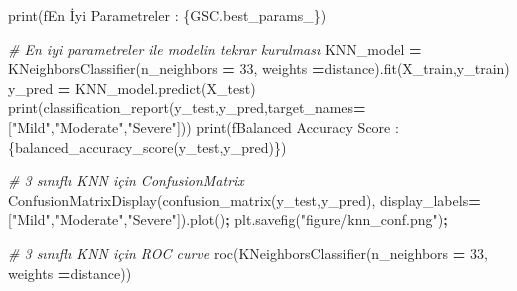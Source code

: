 \documentclass[12pt,twoside]{deuthesis}
\newenvironment{Shaded}{\begin{snugshade}}{\end{snugshade}}
\newcommand{\BuiltInTok}[1]{#1}
\newcommand{\CommentTok}[1]{\textcolor[rgb]{0.56,0.35,0.01}{\textit{#1}}}
\newcommand{\DecValTok}[1]{\textcolor[rgb]{0.00,0.00,0.81}{#1}}
\newcommand{\NormalTok}[1]{#1}
\newcommand{\OperatorTok}[1]{\textcolor[rgb]{0.81,0.36,0.00}{\textbf{#1}}}
\newcommand{\SpecialCharTok}[1]{\textcolor[rgb]{0.00,0.00,0.00}{#1}}
\newcommand{\SpecialStringTok}[1]{\textcolor[rgb]{0.31,0.60,0.02}{#1}}
\newcommand{\StringTok}[1]{\textcolor[rgb]{0.31,0.60,0.02}{#1}}
\begin{document}
\begin{Shaded}
\begin{Highlighting}[]
\BuiltInTok{print}\NormalTok{(}\SpecialStringTok{f\textquotesingle{}En İyi Parametreler : }\SpecialCharTok{\{}\NormalTok{GSC}\SpecialCharTok{.}\NormalTok{best\_params\_}\SpecialCharTok{\}}\SpecialStringTok{\textquotesingle{}}\NormalTok{)}
\end{Highlighting}
\end{Shaded}
\begin{Shaded}
\begin{Highlighting}[]
\CommentTok{\# En iyi parametreler ile modelin tekrar kurulması}
\NormalTok{KNN\_model }\OperatorTok{=}\NormalTok{ KNeighborsClassifier(n\_neighbors }\OperatorTok{=} \DecValTok{33}\NormalTok{,}
\NormalTok{                                 weights }\OperatorTok{=}\StringTok{\textquotesingle{}distance\textquotesingle{}}\NormalTok{).fit(X\_train,y\_train)}
\NormalTok{y\_pred }\OperatorTok{=}\NormalTok{ KNN\_model.predict(X\_test)}
\BuiltInTok{print}\NormalTok{(classification\_report(y\_test,y\_pred,target\_names}\OperatorTok{=}\NormalTok{[}\StringTok{"Mild"}\NormalTok{,}\StringTok{"Moderate"}\NormalTok{,}\StringTok{"Severe"}\NormalTok{]))}
\BuiltInTok{print}\NormalTok{(}\SpecialStringTok{f\textquotesingle{}Balanced Accuracy Score : }\SpecialCharTok{\{}\NormalTok{balanced\_accuracy\_score(y\_test,y\_pred)}\SpecialCharTok{\}}\SpecialStringTok{\textquotesingle{}}\NormalTok{)}
\end{Highlighting}
\end{Shaded}
\begin{Shaded}
\begin{Highlighting}[]
\CommentTok{\# 3 sınıflı KNN için ConfusionMatrix}
\NormalTok{ConfusionMatrixDisplay(confusion\_matrix(y\_test,y\_pred),}
\NormalTok{display\_labels}\OperatorTok{=}\NormalTok{[}\StringTok{"Mild"}\NormalTok{,}\StringTok{"Moderate"}\NormalTok{,}\StringTok{"Severe"}\NormalTok{]).plot()}\OperatorTok{;}
\NormalTok{plt.savefig(}\StringTok{"figure/knn\_conf.png"}\NormalTok{)}\OperatorTok{;}
\end{Highlighting}
\end{Shaded}
\begin{Shaded}
\begin{Highlighting}[]
\CommentTok{\# 3 sınıflı KNN için ROC curve}
\NormalTok{roc(KNeighborsClassifier(n\_neighbors }\OperatorTok{=} \DecValTok{33}\NormalTok{,}
\NormalTok{                         weights }\OperatorTok{=}\StringTok{\textquotesingle{}distance\textquotesingle{}}\NormalTok{))}
\end{Highlighting}
\end{Shaded}
\normalsize
\end{document}
